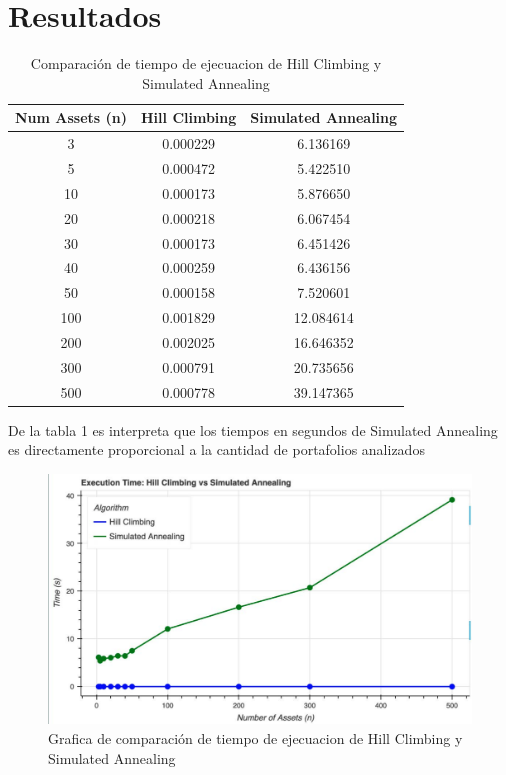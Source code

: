 \documentclass[9pt,a4paper,twoside]{rho-class/rho}
\begin{document}
    \section{Resultados}
        \begin{table}[h]
            \centering
            \begin{tabular}{|c|c|c|}
            \hline
            \textbf{Num Assets (n)} & \textbf{Hill Climbing} & \textbf{Simulated Annealing} \\
            \hline
            3   & 0.000229 & 6.136169 \\
            5   & 0.000472 & 5.422510 \\
            10  & 0.000173 & 5.876650 \\
            20  & 0.000218 & 6.067454 \\
            30  & 0.000173 & 6.451426 \\
            40  & 0.000259 & 6.436156 \\
            50  & 0.000158 & 7.520601 \\
            100 & 0.001829 & 12.084614 \\
            200 & 0.002025 & 16.646352 \\
            300 & 0.000791 & 20.735656 \\
            500 & 0.000778 & 39.147365 \\
            \hline
            \end{tabular}
            \caption{Comparación de tiempo de ejecuacion de Hill Climbing y Simulated Annealing}
            \label{tab:comparison}
        \end{table}

        De la tabla 1 es interpreta que los tiempos en segundos de Simulated Annealing es directamente proporcional a la cantidad de portafolios analizados


        \begin{figure}[h]
            \centering
            \includegraphics[width=\linewidth]{figures/exe_time.pdf}
            \caption{Grafica de comparación de tiempo de ejecuacion de Hill Climbing y Simulated Annealing}
            \label{fig:sample_figure}
        \end{figure}
        
\end{document}
